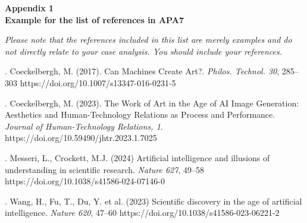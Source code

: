 \documentclass[12pt,a4paper]{article}
\begin{document}
\vspace{0.5cm}
\noindent \textbf{Appendix 1}\\
\textbf{Example for the list of references in APA7}

\vspace{0.3cm}
\noindent \textit{Please note that the references included in this list are merely examples and do not directly relate to your case analysis. You should include your references.}

\vspace{0.5cm}
. Coeckelbergh, M. (2017). Can Machines Create Art?. \textit{Philos. Technol. 30}, 285–303 https://doi.org/10.1007/s13347-016-0231-5

\vspace{0.3cm}
. Coeckelbergh, M. (2023). The Work of Art in the Age of AI Image Generation: Aesthetics and Human-Technology Relations as Process and Performance. \textit{Journal of Human-Technology Relations, 1}. https://doi.org/10.59490/jhtr.2023.1.7025

\vspace{0.3cm}
. Messeri, L., Crockett, M.J. (2024) Artificial intelligence and illusions of understanding in scientific research. \textit{Nature 627}, 49–58 https://doi.org/10.1038/s41586-024-07146-0

\vspace{0.3cm}
. Wang, H., Fu, T., Du, Y. et al. (2023) Scientific discovery in the age of artificial intelligence. \textit{Nature 620}, 47–60 https://doi.org/10.1038/s41586-023-06221-2
\end{document}
